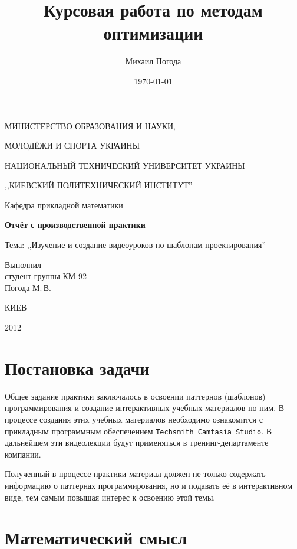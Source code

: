 \documentclass[a4paper,12pt,notitlepage,pdftex,headsepline]{scrreprt}
\author{Михаил Погода}
\title{Курсовая работа по методам оптимизации}
\date{\today}
\begin{document}
  \thispagestyle{empty}
  \begin{center}
    \large
    \MakeUppercase{Министерство образования и науки,}

    \MakeUppercase{молодёжи и спорта Украины}

    \MakeUppercase{Национальный технический университет Украины}

    \MakeUppercase{,,Киевский политехнический институт''}

    \addvspace{6pt}

    \normalsize
    Кафедра прикладной математики

    \vfill

    \textbf{Отчёт с производственной практики}

    Тема: ,,Изучение и создание видеоуроков по шаблонам проектирования''
  \end{center}

  \vfill

  \hfill Выполнил\\

  \hfill студент группы КМ-92\\

  \hfill Погода М.\,В.\\

  \vfill

  \begin{center}
    КИЕВ

    2012
  \end{center}
  \clearpage
  \tableofcontents
  \clearpage

\Large
\chapter{Постановка задачи}

Общее задание практики заключалось в освоении паттернов (шаблонов)
программирования и создание интерактивных учебных материалов по ним.
В процессе создания этих учебных материалов необходимо ознакомится с
прикладным программным обеспечением \texttt{Techsmith Camtasia Studio}.
В дальнейшем эти видеолекции будут применяться в тренинг-департаменте
компании.

Полученный в процессе практики материал должен не только содержать информацию
о паттернах программирования, но и подавать её в интерактивном виде, тем самым
повышая интерес к освоению этой темы.

\chapter{Математический смысл}
\end{document}
